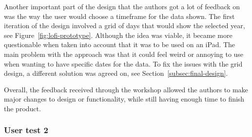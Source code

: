 Another important part of the design that the authors got a lot of feedback on was the way the user would choose a
timeframe for the data shown.
The first iteration of the design involved a grid of days that would show the selected year,
see Figure~\ref{fig:lofi-prototype}.
Although the idea was viable, it became more questionable when taken into account that it was to be used on an iPad.
The main problem with the approach was that it could feel weird or annoying to use when wanting to have specific dates
for the data.
To fix the issues with the grid design, a different solution was agreed on, see Section~\ref{subsec:final-design}.

Overall, the feedback received through the workshop allowed the authors to make major changes to design or
functionality, while still having enough time to finish the product.
\subsubsection{User test 2}\label{subsubsec:user-test-2}
